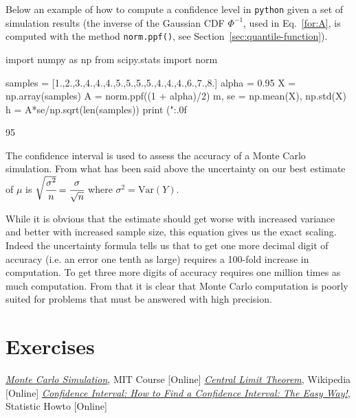 Below an example of how to compute a confidence level in \texttt{python} given a set of simulation results (the inverse of the Gaussian CDF $\Phi^{-1}$, used in Eq.~\ref{for:A}, is computed with the method \texttt{norm.ppf()}, see Section~\ref{sec:quantile-function}).

\begin{ipython}
import numpy as np
from scipy.stats import norm

samples = [1.,2.,3.,4.,4.,4.,5.,5.,5.,5.,4.,4.,4.,6.,7.,8.]
alpha = 0.95
X = np.array(samples)
A = norm.ppf((1 + alpha)/2)
m, se = np.mean(X), np.std(X)
h = A*se/np.sqrt(len(samples))
print ("{:.0f}%
\end{ipython}
\begin{ioutput}
95%
\end{ioutput}

The confidence interval is used to assess the accuracy of a Monte Carlo simulation. From what has been said above the uncertainty on our best estimate of $\mu$ is $\sqrt{\cfrac{\sigma^2}{n}}=\cfrac{\sigma}{\sqrt{n}}$ where \(\sigma^2 = \mathrm{Var}(Y)\).

While it is obvious that the estimate should get worse with increased variance and better with increased sample size, this equation  gives us the exact scaling. Indeed the uncertainty formula tells us that to get one more decimal digit of accuracy (i.e. an error one tenth as large) requires a 100-fold increase in computation. To get three more digits of accuracy requires one million times as much computation. From that it is clear that Monte Carlo computation is poorly suited for problems that must be answered with high precision.

\section*{Exercises}


\begin{thebibliography}{9}
\href{https://www.youtube.com/watch?v=OgO1gpXSUzU}{\emph{Monte Carlo Simulation}}, MIT Course [Online]
 \href{https://en.wikipedia.org/wiki/Central_limit_theorem}{\emph{Central Limit Theorem}}, Wikipedia [Online]
\href{https://www.statisticshowto.com/probability-and-statistics/confidence-interval}{\emph{Confidence Interval: How to Find a Confidence Interval: The Easy Way!}}, Statistic Howto [Online]
\end{thebibliography}









